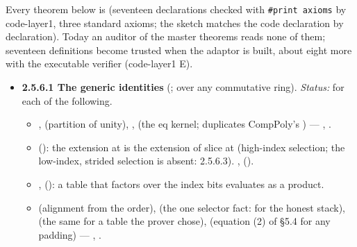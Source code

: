 Every theorem below is  (seventeen declarations checked with \texttt{\#print axioms} by code-layer1, three standard axioms; the sketch matches the code declaration by declaration). Today an auditor of the master theorems reads none of them; seventeen definitions become trusted when the adaptor is built, about eight more with the executable verifier (code-layer1 E).

\begin{itemize}[label={}, leftmargin=1.3em, itemindent=-1.3em, labelwidth=0pt, labelsep=0pt, itemsep=4pt, topsep=3pt]
\item {}\label{obl:node-2.5.6.1}\textbf{2.5.6.1 The generic identities} (; over any commutative ring). \emph{Status:}  for each of the following.
\begin{itemize}[label={}, leftmargin=1.3em, itemindent=-1.3em, labelwidth=0pt, labelsep=0pt, itemsep=4pt, topsep=3pt]
\item \textendash\enspace {},  (partition of unity), ,  (the eq kernel; duplicates CompPoly's ) — , .
\item \textendash\enspace {} (): the extension at  is the extension of slice  at  (high-index selection; the low-index, strided selection is absent: 2.5.6.3). ,  ().
\item \textendash\enspace {},  (): a table that factors over the index bits evaluates as a product.
\item \textendash\enspace {} (alignment from the order),  (the one selector fact:  for the honest stack),  (the same for a table the prover chose),  (equation (2) of §5.4 for any padding) — , .
\end{itemize}

\end{itemize}
